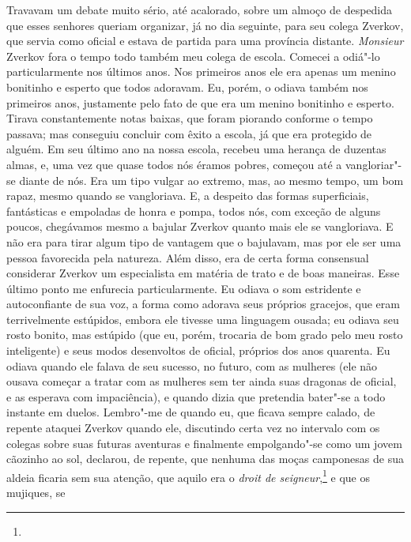 Travavam um debate muito sério, até acalorado, sobre um almoço de despedida que
esses senhores queriam organizar, já no dia seguinte, para seu colega Zverkov,
que servia como oficial e estava de partida para uma província distante.
\textit{Monsieur} Zverkov fora o tempo todo também meu colega de escola.
Comecei a odiá"-lo particularmente nos últimos anos. Nos primeiros anos ele era
apenas um menino bonitinho e esperto que todos adoravam. Eu, porém, o odiava
também nos primeiros anos, justamente pelo fato de que era um menino bonitinho
e esperto.  Tirava constantemente notas baixas, que foram piorando conforme o
tempo passava; mas conseguiu concluir com êxito a escola, já que era protegido
de alguém. Em seu último ano na nossa escola, recebeu uma herança de duzentas
almas, e, uma vez que quase todos nós éramos pobres, começou até a
vangloriar"-se diante de nós. Era um tipo vulgar ao extremo, mas, ao mesmo
tempo, um bom rapaz, mesmo quando se vangloriava. E, a despeito das formas
superficiais, fantásticas e empoladas de honra e pompa, todos nós, com exceção
de alguns poucos, chegávamos mesmo a bajular Zverkov quanto mais ele se
vangloriava. E não era para tirar algum tipo de vantagem que o bajulavam, mas
por ele ser uma pessoa favorecida pela natureza. Além disso, era de certa forma
consensual considerar Zverkov um especialista em matéria de trato e de boas
maneiras. Esse último ponto me enfurecia particularmente. Eu odiava o som
estridente e autoconfiante de sua voz, a forma como adorava seus próprios
gracejos, que eram terrivelmente estúpidos, embora ele tivesse uma linguagem
ousada; eu odiava seu rosto bonito, mas estúpido (que eu, porém, trocaria de
bom grado pelo meu rosto inteligente) e seus modos desenvoltos de oficial,
próprios dos anos quarenta. Eu odiava quando ele falava de seu sucesso, no
futuro, com as mulheres (ele não ousava começar a tratar com as mulheres sem
ter ainda suas dragonas de oficial, e as esperava com impaciência), e quando
dizia que pretendia bater"-se a todo instante em duelos. Lembro"-me de quando eu,
que ficava sempre calado, de repente ataquei Zverkov quando ele, discutindo
certa vez no intervalo com os colegas sobre suas futuras aventuras e finalmente
empolgando"-se como um jovem cãozinho ao sol, declarou, de repente, que nenhuma
das moças camponesas de sua aldeia ficaria sem sua atenção, que aquilo era o
\textit{droit de seigneur},\footnote{ } e que os mujiques, se

